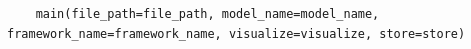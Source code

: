 \documentclass{fisatprojectfinal}
\begin{document}
\begin{appendices}
\begin{lstlisting}
    main(file_path=file_path, model_name=model_name, framework_name=framework_name, visualize=visualize, store=store)
	\end{lstlisting}
\end{appendices}
\end{document}
